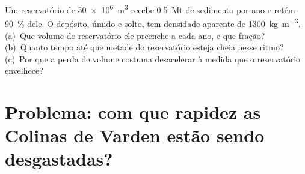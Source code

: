 \begin{exercise}[$\star\star\star$]\label{exo:b1:erosion-transport:12}
Um reservatório de \qty{50e6}{m^3} recebe \qty{0.5}{Mt} de sedimento por ano e retém \qty{90}{\percent} dele. O depósito, úmido e solto, tem densidade aparente de \qty{1300}{kg.m^{-3}}. (a)~Que volume do reservatório ele preenche a cada ano, e que fração? (b)~Quanto tempo até que metade do reservatório esteja cheia nesse ritmo? (c)~Por que a perda de volume costuma desacelerar à medida que o reservatório envelhece?
\end{exercise}

\section{Problema: com que rapidez as Colinas de Varden estão sendo desgastadas?}

